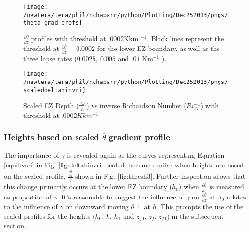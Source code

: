 \begin{figure}[htbp]
    \centering
    \texttt{[image: /newtera/tera/phil/nchaparr/python/Plotting/Dec252013/pngs/theta\_grad\_profs]}
    \caption[$\frac{\partial \overline{\theta}}{\partial z}$ Profiles with Threshold at $.0002$Kkm$^{-1}$]{$\frac{\partial \overline{\theta}}{\partial z}$ profiles with threshold at $.0002$Kkm $^{-1}$.  Black lines represent the threshold at $\frac{\partial \overline{\theta}}{\partial z} = 0.0002$ for the lower EZ boundary, as well as the three lapse rates ($0.0025, \ 0.005$ and $.01$  Km$^{-1}$ ).}
    \label{fig:thresh}   %
\end{figure}
\begin{figure}[htbp]
\centering
 \texttt{[image: /newtera/tera/phil/nchaparr/python/Plotting/Dec252013/pngs/scaleddeltahinvri]}

       
        \caption{Scaled EZ Depth ($\frac{\Delta h}{h}$) vs inverse Richardson Number ($Ri_{\Delta}^{-1}$) with threshold at $.0002Kkm^{-1}$}
         \label{fig:scaledeltahinvri}
\end{figure}
\clearpage
\subsubsection{Heights based on scaled $\overline{\theta}$ gradient profile}
\label{subsubsec:scaleddthetaprof}
The importance of $\gamma$ is revealed again as the curves representing Equation \ref{eq:dhvsri} in Fig. \ref{fig:deltahinvri_scaled} become similar when heights are based on the scaled profile, $\frac{\frac{\partial \overline{\theta}}{\partial z}}{\gamma}$ shown in Fig. \ref{fig:thresh3}. Further inspection shows that this change primarily occurs at the lower EZ boundary ($h_{0}$) when $\frac{\partial \overline{\theta}}{\partial z}$ is measured as proportion of $\gamma$. It's reasonable to suggest the influence of $\gamma$ on $\frac{\partial \overline{\theta}}{\partial z}$ at $h_{0}$ relates to the influence of $\gamma$ on downward moving $\theta^{'+}$ at $h$.  This prompts the use of the scaled profiles for the heights ($h_{0}$, $h$, $h_{1}$ and $z_{f0}$, $z_{f}$, $z_{f1}$) in the subsequent section.\\


